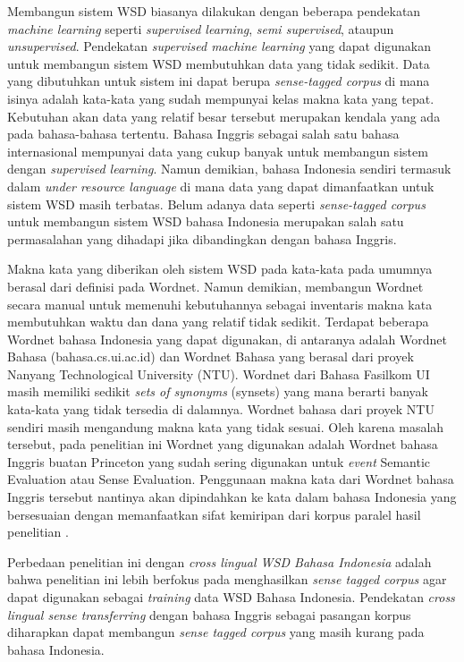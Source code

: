 Membangun sistem WSD biasanya dilakukan dengan beberapa pendekatan \textit{machine learning} seperti \textit{supervised learning}, \textit{semi supervised}, ataupun \textit{unsupervised}. Pendekatan \textit{supervised machine learning} yang dapat digunakan untuk membangun sistem WSD membutuhkan data yang tidak sedikit. Data yang dibutuhkan untuk sistem ini dapat berupa \textit{sense-tagged corpus} di mana isinya adalah kata-kata yang sudah mempunyai kelas makna kata yang tepat. Kebutuhan akan data yang relatif besar tersebut merupakan kendala yang ada pada bahasa-bahasa tertentu. Bahasa Inggris sebagai salah satu bahasa internasional mempunyai data yang cukup banyak untuk membangun sistem dengan \textit{supervised learning}. Namun demikian, bahasa Indonesia sendiri termasuk dalam \textit{under resource language} di mana data yang dapat dimanfaatkan untuk sistem WSD masih terbatas. Belum adanya data seperti \textit{sense-tagged corpus} untuk membangun sistem WSD bahasa Indonesia merupakan salah satu permasalahan yang dihadapi jika dibandingkan dengan bahasa Inggris.

Makna kata yang diberikan oleh sistem WSD pada kata-kata pada umumnya berasal dari definisi pada Wordnet. Namun demikian, membangun Wordnet secara manual untuk memenuhi kebutuhannya sebagai inventaris makna kata membutuhkan waktu dan dana yang relatif tidak sedikit. Terdapat beberapa Wordnet bahasa Indonesia yang dapat digunakan, di antaranya adalah Wordnet Bahasa (bahasa.cs.ui.ac.id) dan Wordnet Bahasa yang berasal dari proyek Nanyang Technological University (NTU).  Wordnet dari Bahasa Fasilkom UI masih memiliki sedikit \textit{sets of synonyms} (synsets) yang mana berarti banyak kata-kata yang tidak tersedia di dalamnya. Wordnet bahasa dari proyek NTU sendiri masih mengandung makna kata yang tidak sesuai. Oleh karena masalah tersebut, pada penelitian ini Wordnet yang digunakan adalah Wordnet bahasa Inggris buatan Princeton yang sudah sering digunakan untuk \textit{event} Semantic Evaluation atau Sense Evaluation. Penggunaan makna kata dari Wordnet bahasa Inggris tersebut nantinya akan dipindahkan ke kata dalam bahasa Indonesia yang bersesuaian dengan memanfaatkan sifat kemiripan dari korpus paralel hasil penelitian \citep{larasati2012identic}.

Perbedaan penelitian ini dengan \textit{cross lingual WSD Bahasa Indonesia} \citep{septiantri2013wsd} adalah bahwa penelitian ini lebih berfokus pada menghasilkan \textit{sense tagged corpus} agar dapat digunakan sebagai \textit{training} data WSD Bahasa Indonesia. Pendekatan \textit{cross lingual sense transferring} dengan bahasa Inggris sebagai pasangan korpus diharapkan dapat membangun \textit{sense tagged corpus} yang masih kurang pada bahasa Indonesia. 
